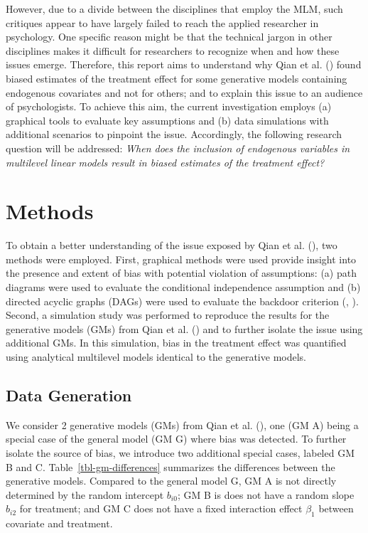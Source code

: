 \documentclass[
  11pt,
  a4paper,
]{article}
\begin{document}
However, due to a divide between the disciplines that employ the MLM,
such critiques appear to have largely failed to reach the applied
researcher in psychology. One specific reason might be that the
technical jargon in other disciplines makes it difficult for researchers
to recognize when and how these issues emerge. Therefore, this report
aims to understand why Qian et al. () found
biased estimates of the treatment effect for some generative models
containing endogenous covariates and not for others; and to explain this
issue to an audience of psychologists. To achieve this aim, the current
investigation employs (a) graphical tools to evaluate key assumptions
and (b) data simulations with additional scenarios to pinpoint the
issue. Accordingly, the following research question will be addressed:
\emph{When does the inclusion of endogenous variables in multilevel
linear models result in biased estimates of the treatment effect?}

\section{Methods}\label{methods}

To obtain a better understanding of the issue exposed by Qian et al.
(), two methods were employed. First,
graphical methods were used provide insight into the presence and extent
of bias with potential violation of assumptions: (a) path diagrams were
used to evaluate the conditional independence assumption and (b)
directed acyclic graphs (DAGs) were used to evaluate the backdoor
criterion (,
). Second, a simulation study was
performed to reproduce the results for the generative models (GMs) from
Qian et al. () and to further isolate the
issue using additional GMs. In this simulation, bias in the treatment
effect was quantified using analytical multilevel models identical to
the generative models.

\subsection{Data Generation}\label{data-generation}

We consider 2 generative models (GMs) from Qian et al.
(), one (GM A) being a special case of the
general model (GM G) where bias was detected. To further isolate the
source of bias, we introduce two additional special cases, labeled GM B
and C. Table~\ref{tbl-gm-differences} summarizes the differences between
the generative models. Compared to the general model G, GM A is not
directly determined by the random intercept \(b_{i0}\); GM B is does not
have a random slope \(b_{i2}\) for treatment; and GM C does not have a
fixed interaction effect \(\beta_1\) between covariate and treatment.
\end{document}
